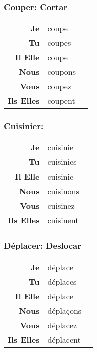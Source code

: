 \documentclass{subfiles}
\begin{document}
\begin{multicols*}{3}
        \subsubsection{Couper: Cortar}
            \begin{tabular}{r l r}
                \textbf{Je}        & coupe   &\\
                \textbf{Tu}        & coupes  &\\
                \textbf{Il Elle}   & coupe   &\\
                \textbf{Nous}      & coupons &\\
                \textbf{Vous}      & coupez  &\\
                \textbf{Ils Elles} & coupent &
            \end{tabular}

        \subsubsection{Cuisinier: }
            \begin{tabular}{r l r}
                \textbf{Je}        & cuisinie  &\\
                \textbf{Tu}        & cuisinies &\\
                \textbf{Il Elle}   & cuisinie  &\\
                \textbf{Nous}      & cuisinons &\\
                \textbf{Vous}      & cuisinez  &\\
                \textbf{Ils Elles} & cuisinent &
            \end{tabular}

        \subsubsection{Déplacer: Deslocar}
            \begin{tabular}{r l r}
                \textbf{Je}        & déplace   &\\
                \textbf{Tu}        & déplaces  &\\
                \textbf{Il Elle}   & déplace   &\\
                \textbf{Nous}      & déplaçons &\\
                \textbf{Vous}      & déplacez  &\\
                \textbf{Ils Elles} & déplacent &
            \end{tabular}
    

\end{multicols*}
\end{document}
